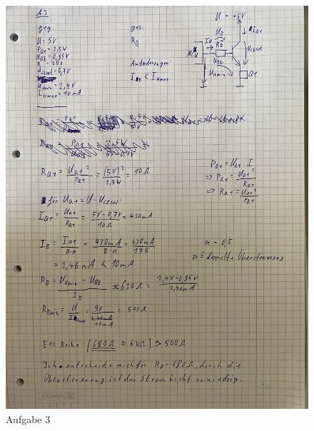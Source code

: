 \documentclass{article}
\begin{document}
\clearpage
\begin{figure}
    \centering
    \includegraphics[width=0.92\linewidth]{A3.jpg}
    \caption{Aufgabe 3}
\end{figure}
\end{document}
